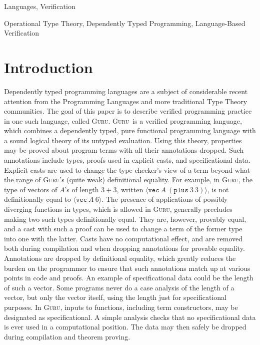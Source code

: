 \documentclass[9pt,natbib]{sigplanconf}
\newcommand{\guru}[0]{\textsc{Guru}}
\begin{document}

\terms
Languages, Verification

\keywords
Operational Type Theory, Dependently Typed Programming, Language-Based Verification

\section{Introduction}

Dependently typed programming languages are a subject of considerable
recent attention from the Programming Languages and more traditional
Type Theory communities.  The goal of this paper is to describe
verified programming practice in one such language, called \guru.
\guru\ is a verified programming language, which combines a
dependently typed, pure functional programming language with a sound
logical theory of its untyped evaluation.  Using this theory,
properties may be proved about program terms with all their
annotations dropped.  Such annotations include types, proofs used in
explicit casts, and specificational data.  Explicit casts are used to
change the type checker's view of a term beyond what the range of
\guru's (quite weak) definitional equality.  For example, in \guru,
the type of vectors of $A$'s of length $3+3$, written $\langle
\texttt{vec}\ A\ (\texttt{plus}\ 3\ 3)\rangle$, is not definitionally
equal to $\langle \texttt{vec}\ A\ 6\rangle$.  The presence of
applications of possibly diverging functions in types, which is
allowed in \guru, generally precludes making two such types
definitionally equal.  They are, however, provably equal, and a cast
with such a proof can be used to change a term of the former type into
one with the latter.  Casts have no computational effect, and are
removed both during compilation and when dropping annotations for
provable equality.  Annotations are dropped by definitional equality,
which greatly reduces the burden on the programmer to ensure that such
annotations match up at various points in code and proofs.  An example
of specificational data could be the length of such a vector.  Some
programs never do a case analysis of the length of a vector, but only
the vector itself, using the length just for specificational purposes.
In \guru, inputs to functions, including term constructors, may be
designated as specificational.  A simple analysis checks that no
specificational data is ever used in a computational position.  The
data may then safely be dropped during compilation and theorem
proving.
\end{document}
